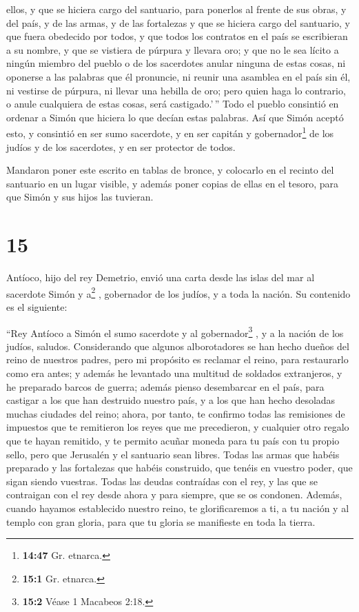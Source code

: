 ellos, y que se hiciera cargo del santuario, para ponerlos al frente de
sus obras, y del país, y de las armas, y de las fortalezas y que se
hiciera cargo del santuario,  y que fuera obedecido por
todos, y que todos los contratos en el país se escribieran a su nombre,
y que se vistiera de púrpura y llevara oro;  y que no le
sea lícito a ningún miembro del pueblo o de los sacerdotes anular
ninguna de estas cosas, ni oponerse a las palabras que él pronuncie, ni
reunir una asamblea en el país sin él, ni vestirse de púrpura, ni llevar
una hebilla de oro;  pero quien haga lo contrario, o
anule cualquiera de estas cosas, será castigado.'\,'' 
Todo el pueblo consintió en ordenar a Simón que hiciera lo que decían
estas palabras.  Así que Simón aceptó esto, y consintió
en ser sumo sacerdote, y en ser capitán y gobernador\footnote{\textbf{14:47}
  Gr. etnarca.} de los judíos y de los sacerdotes, y en ser protector de
todos.

 Mandaron poner este escrito en tablas de bronce, y
colocarlo en el recinto del santuario en un lugar visible,
 y además poner copias de ellas en el tesoro, para que
Simón y sus hijos las tuvieran.

\hypertarget{section-14}{%
\section{15}\label{section-14}}

 Antíoco, hijo del rey Demetrio, envió una carta desde las
islas del mar al sacerdote Simón y a\footnote{\textbf{15:1} Gr. etnarca.}
, gobernador de los judíos, y a toda la nación.  Su
contenido es el siguiente:

``Rey Antíoco a Simón el sumo sacerdote y al gobernador\footnote{\textbf{15:2}
  Véase 1 Macabeos 2:18.} , y a la nación de los judíos, saludos.
 Considerando que algunos alborotadores se han hecho
dueños del reino de nuestros padres, pero mi propósito es reclamar el
reino, para restaurarlo como era antes; y además he levantado una
multitud de soldados extranjeros, y he preparado barcos de guerra;
 además pienso desembarcar en el país, para castigar a los
que han destruido nuestro país, y a los que han hecho desoladas muchas
ciudades del reino;  ahora, por tanto, te confirmo todas
las remisiones de impuestos que te remitieron los reyes que me
precedieron, y cualquier otro regalo que te hayan remitido,
 y te permito acuñar moneda para tu país con tu propio
sello,  pero que Jerusalén y el santuario sean libres.
Todas las armas que habéis preparado y las fortalezas que habéis
construido, que tenéis en vuestro poder, que sigan siendo vuestras.
 Todas las deudas contraídas con el rey, y las que se
contraigan con el rey desde ahora y para siempre, que se os condonen.
 Además, cuando hayamos establecido nuestro reino, te
glorificaremos a ti, a tu nación y al templo con gran gloria, para que
tu gloria se manifieste en toda la tierra.

